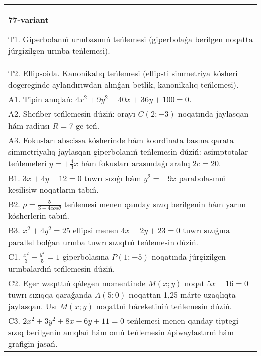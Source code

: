 \documentclass{article}
\begin{document}
\begin{tabular}{m{17cm}}
\textbf{77-variant}
\newline

T1. Giperbolanıń urınbasınıń teńlemesi (giperbolaǵa berilgen noqatta júrgizilgen urınba teńlemesi).\\

T2. Ellipsoida. Kanonikalıq teńlemesi (ellipsti simmetriya kósheri dogereginde aylandırıwdan alınǵan betlik, kanonikalıq teńlemesi).\\

A1. Tipin anıqlań: $4 x^2+9 y^2-40 x+36 y+100=0$.\\

A2. Sheńber teńlemesin dúziń: orayı $C (2;-3) $ noqatında jaylasqan hám radiusı $R=7$ ge teń.\\

A3. Fokusları abscissa kósherinde hám koordinata basına qarata simmetriyalıq jaylasqan giperbolanıń teńlemesin dúziń: asimptotalar teńlemeleri $y=\pm \frac{4}{3}x$ hám fokusları arasındaǵı aralıq $2 c=20$.\\

B1. $3x + 4y - 12 = 0$ tuwrı sızıǵı hám $y^{2} = - 9x$ parabolasınıń kesilisiw noqatların tabıń.  \\

B2. $\rho = \frac{5}{3 - 4cos\theta}$ teńlemesi menen qanday sızıq berilgenin hám yarım kósherlerin tabıń.  \\

B3. $x^{2} + 4y^{2} = 25$ ellipsi menen $4x - 2y + 23 = 0$ tuwrı sızıǵına parallel bolǵan urınba tuwrı sızıqtıń teńlemesin dúziń.  \\

C1. $\frac{x^{2}}{3} - \frac{y^{2}}{5} = 1$ giperbolasına $P(1; - 5)$ noqatında júrgizilgen urınbalardıń teńlemesin dúziń.\\

C2. Eger waqıttıń qálegen momentinde $M(x;y)$ noqat $5x - 16 = 0$ tuwrı sızıqqa qaraǵanda $A(5;0)$ noqattan 1,25 márte uzaqlıqta jaylasqan. Usı $M(x;y)$ noqattıń háreketiniń teńlemesin dúziń.  \\

C3. $2x^{2} + 3y^{2} + 8x - 6y + 11 = 0$ teńlemesi menen qanday tiptegi sızıq berilgenin anıqlań hám onıń teńlemesin ápiwaylastırıń hám grafigin jasań.  \\

\end{tabular}
\vspace{1cm}
\end{document}

